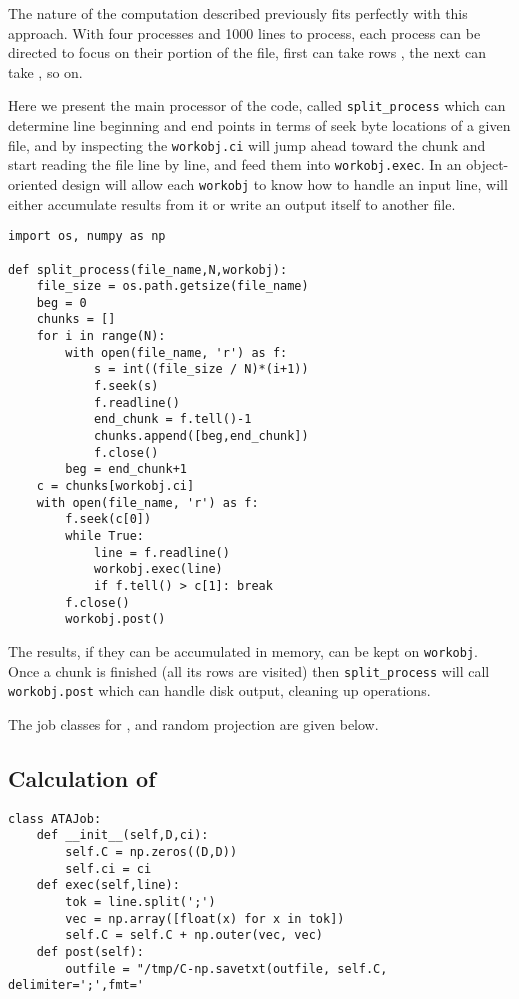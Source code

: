 \documentclass{article}
\begin{document}
The nature of the computation described previously fits perfectly with this
approach. With four processes and 1000 lines to process, each process
 can be directed to focus on their portion of the file, first can
take rows , the next can take , so on.

Here we present the main processor of the code, called \verb!split_process!
which can determine line beginning and end points in terms of seek byte
locations of a given file, and by inspecting the \verb!workobj.ci! will
jump ahead toward the chunk and start reading the file line by line, and
feed them into \verb!workobj.exec!. In an object-oriented design will allow each
\verb!workobj! to know how to handle an input line, will either accumulate
results from it or write an output itself to another file.

\begin{verbatim}
import os, numpy as np

def split_process(file_name,N,workobj):
    file_size = os.path.getsize(file_name)
    beg = 0
    chunks = []
    for i in range(N):
        with open(file_name, 'r') as f:
            s = int((file_size / N)*(i+1))
            f.seek(s)
            f.readline()
            end_chunk = f.tell()-1
            chunks.append([beg,end_chunk])
            f.close()
        beg = end_chunk+1
    c = chunks[workobj.ci]
    with open(file_name, 'r') as f:
        f.seek(c[0])
        while True:
            line = f.readline()
            workobj.exec(line)
            if f.tell() > c[1]: break
        f.close()
        workobj.post()
\end{verbatim}

The results, if they can be accumulated in memory, can be kept on
\verb!workobj!. Once a chunk is finished (all its rows are visited) then
\verb!split_process! will call \verb!workobj.post! which can handle disk output,
cleaning up operations.

The job classes for ,  and random projection are given below.

\subsection{Calculation of }

\begin{verbatim}
class ATAJob:
    def __init__(self,D,ci):
        self.C = np.zeros((D,D))
        self.ci = ci
    def exec(self,line):
        tok = line.split(';')
        vec = np.array([float(x) for x in tok])
        self.C = self.C + np.outer(vec, vec)
    def post(self):
        outfile = "/tmp/C-np.savetxt(outfile, self.C, delimiter=';',fmt='\end{verbatim}
\end{document}
